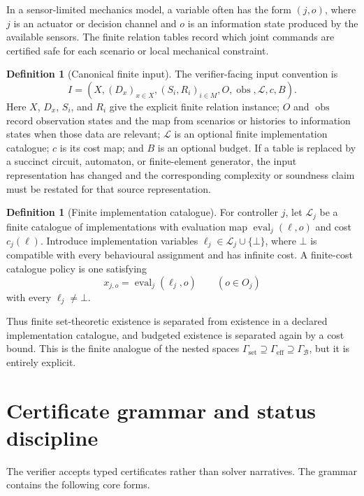\documentclass[11pt]{article}
\theoremstyle{plain}
\theoremstyle{definition}
\newtheorem{definition}[theorem]{Definition}
\theoremstyle{remark}
\newcommand{\GammaSet}{\Gamma_{\mathrm{set}}}
\newcommand{\GammaEff}{\Gamma_{\mathrm{eff}}}
\newcommand{\GammaB}{\Gamma_{\mathcal B}}
\begin{document}
In a sensor-limited mechanics model, a variable often has the form \((j,o)\),
where \(j\) is an actuator or decision channel and \(o\) is an information state
produced by the available sensors.  The finite relation tables record which
joint commands are certified safe for each scenario or local mechanical
constraint.

\begin{definition}[Canonical finite input]
The verifier-facing input convention is
\[
I=(X,(D_x)_{x\in X},(S_i,R_i)_{i\in M},O,\operatorname{obs},
\mathcal L,c,B).
\]
Here \(X\), \(D_x\), \(S_i\), and \(R_i\) give the explicit finite relation
instance; \(O\) and \(\operatorname{obs}\) record observation states and the map
from scenarios or histories to information states when those data are relevant;
\(\mathcal L\) is an optional finite implementation catalogue; \(c\) is its cost
map; and \(B\) is an optional budget.  If a table is replaced by a succinct
circuit, automaton, or finite-element generator, the input representation has
changed and the corresponding complexity or soundness claim must be restated for
that source representation.
\end{definition}

\begin{definition}[Finite implementation catalogue]
For controller \(j\), let \(\mathcal L_j\) be a finite catalogue of
implementations with evaluation map \(\operatorname{eval}_j(\ell,o)\) and cost
\(c_j(\ell)\).  Introduce implementation variables
\(\ell_j\in\mathcal L_j\cup\{\bot\}\), where \(\bot\) is compatible with every
behavioural assignment and has infinite cost.  A finite-cost catalogue policy is
one satisfying
\[
  x_{j,o}=\operatorname{eval}_j(\ell_j,o)
  \qquad(o\in O_j)
\]
with every \(\ell_j\ne\bot\).
\end{definition}

Thus finite set-theoretic existence is separated from existence in a declared
implementation catalogue, and budgeted existence is separated again by a cost
bound.  This is the finite analogue of the nested spaces
\(\GammaSet\supseteq\GammaEff\supseteq\GammaB\), but it is entirely explicit.

\section{Certificate grammar and status discipline}
\label{sec:certificates}

The verifier accepts typed certificates rather than solver narratives.  The
grammar contains the following core forms.
\end{document}
